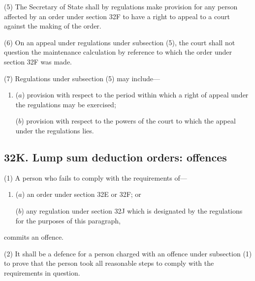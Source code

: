 \documentclass[a4paper]{article}
\begin{document}
(5)
The Secretary of State shall by regulations make provision for any person affected by an order under section 32F to have a right to appeal to a court against the making of the order.

(6)
On an appeal under regulations under subsection (5), the court shall not question the maintenance calculation by reference to which the order under section 32F was made.

(7)
Regulations under subsection (5) may include---
\begin{enumerate}\item[]
($a$) provision with respect to the period within which a right of appeal under the regulations may be exercised;

($b$) provision with respect to the powers of the court to which the appeal under the regulations lies.
\end{enumerate}


\subsection{32K. Lump sum deduction orders: offences}

(1) A person who fails to comply with the requirements of---
\begin{enumerate}\item[]
($a$) an order under section 32E or 32F; or

($b$) any regulation under section 32J which is designated by the regulations for the purposes of this paragraph,
\end{enumerate}
commits an offence.

(2)
It shall be a defence for a person charged with an offence under subsection (1) to prove that the person took all reasonable steps to comply with the requirements in question.
\end{document}
